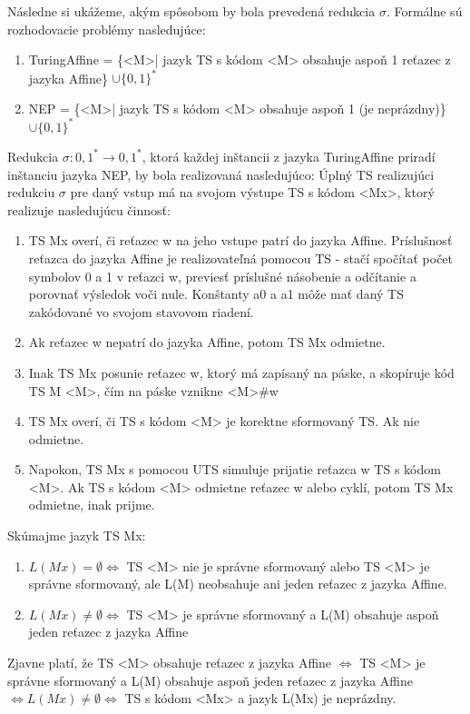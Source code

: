 \documentclass[10pt]{article}
\begin{document}
Následne si ukážeme, akým spôsobom by bola prevedená redukcia $\sigma$.
Formálne sú rozhodovacie problémy nasledujúce:
\begin{enumerate}
    \item TuringAffine = \{<M>| jazyk TS s kódom <M> obsahuje aspoň 1 reťazec z jazyka Affine\} $\cup \{0,1\}^*$ 
    \item NEP = \{<M>| jazyk TS s kódom <M> obsahuje aspoň 1 (je neprázdny)\} $\cup \{0,1\}^*$ 
\end{enumerate}

Redukcia $\sigma: {0,1}^* \to {0,1}^*$, ktorá každej inštancii z jazyka TuringAffine priradí
inštanciu jazyka NEP, by bola realizovaná nasledujúco:
Úplný TS realizujúci redukciu $\sigma$ pre daný vstup má na svojom výstupe TS s kódom <Mx>, ktorý
realizuje nasledujúcu činnosť:
\begin{enumerate}
    \item TS Mx overí, či reťazec w na jeho vstupe patrí do jazyka Affine. Príslušnosť reťazca do
        jazyka Affine je realizovateľná pomocou TS - stačí spočítať počet symbolov 0 a 1 v reťazci
        w, previesť príslušné násobenie a odčítanie a porovnať výsledok voči nule. Konštanty
        a0 a a1 môže mať daný TS zakódované vo svojom stavovom riadení.
    \item Ak reťazec w nepatrí do jazyka Affine, potom TS Mx odmietne.
    \item Inak TS Mx posunie reťazec w, ktorý má zapísaný na páske, a skopíruje kód
        TS M <M>, čím na páske vznikne <M>\#w
    \item TS Mx overí, či TS s kódom <M> je korektne sformovaný TS. Ak nie odmietne.
    \item Napokon, TS Mx s pomocou UTS simuluje prijatie reťazca w TS s kódom <M>. Ak TS s kódom <M>
        odmietne reťazec w alebo cyklí, potom TS Mx odmietne, inak prijme.
\end{enumerate}
Skúmajme jazyk TS Mx:
\begin{enumerate}
    \item $L(Mx) = \emptyset \iff$ TS <M> nie je správne sformovaný alebo TS <M> je správne
        sformovaný, ale L(M) neobsahuje ani jeden reťazec z jazyka Affine.
    \item $L(Mx) \neq \emptyset \iff$ TS <M> je správne sformovaný a L(M) obsahuje aspoň jeden reťazec
        z jazyka Affine
\end{enumerate}

Zjavne platí, že TS <M> obsahuje reťazec z jazyka Affine $\iff$ TS <M> je správne sformovaný a L(M)
obsahuje aspoň jeden reťazec z jazyka Affine $\iff L(Mx) \neq \emptyset \iff$ TS s kódom <Mx> a
jazyk L(Mx) je neprázdny.
\end{document}
